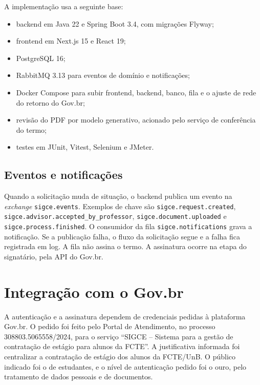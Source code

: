 A implementação usa a seguinte base:

\begin{itemize}
    \item backend em Java 22 e Spring Boot 3.4, com migrações Flyway;
    \item frontend em Next.js 15 e React 19;
    \item PostgreSQL 16;
    \item RabbitMQ 3.13 para eventos de domínio e notificações;
    \item Docker Compose para subir frontend, backend, banco, fila e o ajuste de rede do retorno do Gov.br;
    \item revisão do PDF por modelo generativo, acionado pelo serviço de conferência do termo;
    \item testes em JUnit, Vitest, Selenium e JMeter.
\end{itemize}

\subsection{Eventos e notificações}

Quando a solicitação muda de situação, o backend publica um evento na \textit{exchange} \texttt{sigce.\allowbreak events}. Exemplos de chave são \texttt{sigce.\allowbreak request.\allowbreak created}, \texttt{sigce.\allowbreak advisor.\allowbreak accepted\_\allowbreak by\_\allowbreak professor}, \texttt{sigce.\allowbreak document.\allowbreak uploaded} e \texttt{sigce.\allowbreak process.\allowbreak finished}. O consumidor da fila \texttt{sigce.\allowbreak notifications} grava a notificação. Se a publicação falha, o fluxo da solicitação segue e a falha fica registrada em log. A fila não assina o termo. A assinatura ocorre na etapa do signatário, pela API do Gov.br.

\section{Integração com o Gov.br}

A autenticação e a assinatura dependem de credenciais pedidas à plataforma Gov.br. O pedido foi feito pelo Portal de Atendimento, no processo 308803.5065558/2024, para o serviço ``SIGCE -- Sistema para a gestão de contratação de estágio para alunos da FCTE''. A justificativa informada foi centralizar a contratação de estágio dos alunos da FCTE/UnB. O público indicado foi o de estudantes, e o nível de autenticação pedido foi o ouro, pelo tratamento de dados pessoais e de documentos.

